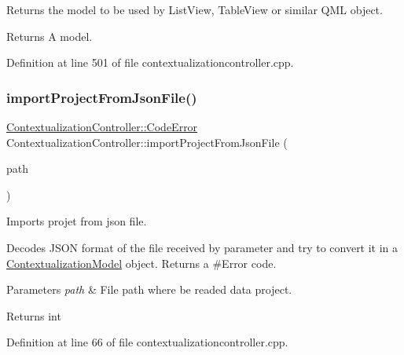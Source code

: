 Returns the model to be used by List\+View, Table\+View or similar Q\+ML object. 

\begin{DoxyReturn}{Returns}
A model. 
\end{DoxyReturn}


Definition at line 501 of file contextualizationcontroller.\+cpp.

\mbox{\label{classContextualizationController_ae2b31282f2258673757c77592f7ded00}} 
\subsubsection{\texorpdfstring{import\+Project\+From\+Json\+File()}{importProjectFromJsonFile()}}
{\footnotesize\ttfamily \mbox{\hyperlink{classContextualizationController_acb38587f7f9e610a5950956b345d69fd}{Contextualization\+Controller\+::\+Code\+Error}} Contextualization\+Controller\+::import\+Project\+From\+Json\+File (\begin{DoxyParamCaption}\item[{const Q\+String \&}]{path }\end{DoxyParamCaption})\hspace{0.3cm}{\ttfamily [protected]}}



Imports projet from json file. 

Decodes J\+S\+ON format of the file received by parameter and try to convert it in a \mbox{\hyperlink{classContextualizationModel}{Contextualization\+Model}} object. Returns a \#\+Error code. 
\begin{DoxyParams}{Parameters}
{\em path} & File path where be readed data project. \\
\hline
\end{DoxyParams}
\begin{DoxyReturn}{Returns}
int 
\end{DoxyReturn}


Definition at line 66 of file contextualizationcontroller.\+cpp.

\mbox{\label{classContextualizationController_a7eaa7277a256b9dbf26573a651e442bf}} 
